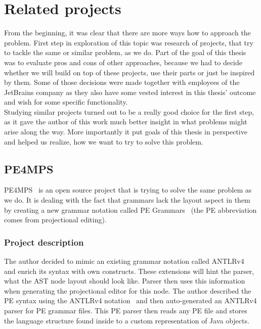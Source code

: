 \chapter{Related projects}
\label{chap:related_projects}

From the beginning, it was clear that there are more ways how to approach the problem.
First step in exploration of this topic was research of projects, that try to tackle the same or similar problem, as we do.
Part of the goal of this thesis was to evaluate pros and cons of other approaches, because we had to decide whether we will build on top of these projects, use their parts or just be inspired by them.
Some of those decisions were made together with employees of the JetBrains company as they also have some vested interest in this thesis' outcome and wish for some specific functionality.
\\

Studying similar projects turned out to be a really good choice for the first step, as it gave the author of this work much better insight in what problems might arise along the way.
More importantly it put goals of this thesis in perspective and helped us realize, how we want to try to solve this problem.

\section{PE4MPS}
\label{chap:pe4mps}
PE4MPS~\cite{PE4MPS} is an open source project that is trying to solve the same problem as we do.
It is dealing with the fact that grammars lack the layout aspect in them by creating a new grammar notation called PE Grammars~\cite{PE} (the PE abbreviation comes from projectional editing).

\subsection{Project description}
The author decided to mimic an existing grammar notation called ANTLRv4~\cite{ANTLR4} and enrich its syntax with own constructs.
These extensions will hint the parser, what the AST node layout should look like.
Parser then uses this information when generating the projectional editor for this node.
The author described the PE syntax using the ANTLRv4 notation~\cite{ANTLR4reference} and then auto-generated an ANTLRv4 parser for PE grammar files.
This PE parser then reads any PE file and stores the language structure found inside to a custom representation of Java objects.
\\

